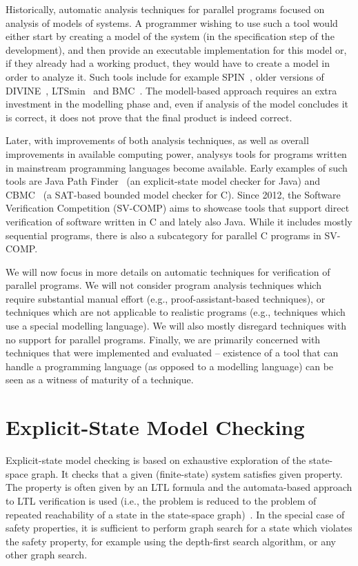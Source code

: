 Historically, automatic analysis techniques for parallel programs focused on analysis of models of systems.
A programmer wishing to use such a tool would either start by creating a model
of the system (in the specification step of the development), and then provide
an executable implementation for this model or, if they already had a working
product, they would have to create a model in order to analyze it.
Such tools include for example SPIN~, older versions of DIVINE~, LTSmin~ and BMC~.
The modell-based approach requires an extra investment in the modelling phase
and, even if analysis of the model concludes it is correct, it does not prove
that the final product is indeed correct.

Later, with improvements of both analysis techniques, as well as overall
improvements in available computing power, analysys tools for programs written
in mainstream programming languages become available.
Early examples of such tools are Java Path Finder~ (an explicit-state model checker for Java) and CBMC~ (a SAT-based bounded model checker for C).
Since 2012, the Software Verification Competition (SV-COMP) 
aims to showcase tools that support direct verification of software written in
C and lately also Java.
While it includes mostly sequential programs, there is also a subcategory for
parallel C programs in SV-COMP.

We will now focus in more details on automatic techniques for verification of
parallel programs.
We will not consider program analysis techniques which require substantial manual effort (e.g., proof-assistant-based techniques), or techniques which are not applicable to realistic programs (e.g., techniques which use a special modelling language).
We will also mostly disregard techniques with no support for parallel programs.
Finally, we are primarily concerned with techniques that were implemented and evaluated -- existence of a tool that can handle a programming language (as opposed to a modelling language) can be seen as a witness of maturity of a technique.

\section{Explicit-State Model Checking}

Explicit-state model checking is based on exhaustive exploration of the
state-space graph.
It checks that a given (finite-state) system satisfies given property.
The property is often given by an LTL formula and the automata-based approach
to LTL verification is used (i.e., the problem is reduced to the problem of
repeated reachability of a state in the state-space graph)~.
In the special case of safety properties, it is sufficient to perform graph
search for a state which violates the safety property, for example using the
depth-first search algorithm, or any other graph search.

